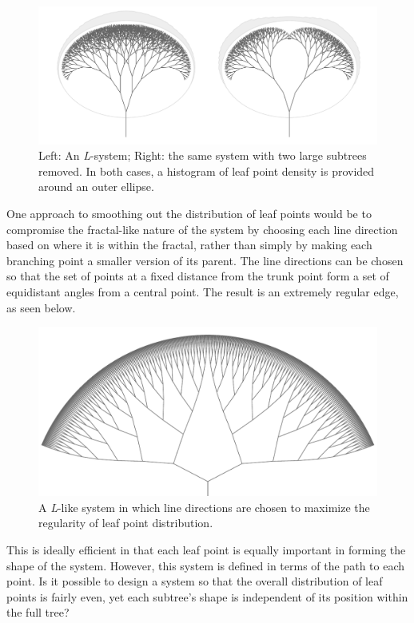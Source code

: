 \documentclass[]{article}
\begin{document}
\begin{figure}[htbp]
\centering
\includegraphics{images/pdfs/ellsystem2.pdf}
\caption{Left: An \emph{L}-system; Right: the same system with two large
subtrees removed. In both cases, a histogram of leaf point density is
provided around an outer ellipse.}
\end{figure}

One approach to smoothing out the distribution of leaf points would be
to compromise the fractal-like nature of the system by choosing each
line direction based on where it is within the fractal, rather than
simply by making each branching point a smaller version of its parent.
The line directions can be chosen so that the set of points at a fixed
distance from the trunk point form a set of equidistant angles from a
central point. The result is an extremely regular edge, as seen below.

\begin{figure}[htbp]
\centering
\includegraphics{images/pdfs/well_distributed_ell_like_system.pdf}
\caption{A \emph{L}-like system in which line directions are chosen to
maximize the regularity of leaf point distribution.}
\end{figure}

This is ideally efficient in that each leaf point is equally important
in forming the shape of the system. However, this system is defined in
terms of the path to each point. Is it possible to design a system so
that the overall distribution of leaf points is fairly even, yet each
subtree's shape is independent of its position within the full tree?
\end{document}
